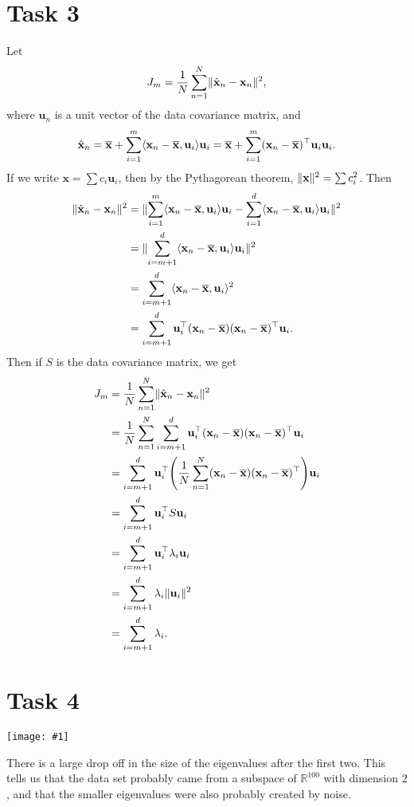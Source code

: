 \documentclass{article}
\newcommand{\T}{\top}
\newcommand{\R}{\mathbb{R}}
\newcommand{\mean}[1]{\overline{#1}}
\newcommand{\image}[2]{\begin{center}\texttt{[image: \#1]}\end{center}}
\renewcommand{\vec}[1]{\mathbf{#1}}
\DeclarePairedDelimiter{\p}{(}{)}
\DeclarePairedDelimiter{\norm}{\Vert}{\Vert}
\DeclarePairedDelimiter{\inner}{\langle}{\rangle}
\begin{document}
\section*{Task 3}
Let
\[
	J_m = \frac{1}{N} \sum_{n=1}^N \norm{\hat{\vec{x}}_n - \vec{x}_n}^2,
\]
where $\vec{u}_n$ is a unit vector of the data covariance matrix, and
\[
	\hat{\vec{x}}_n = \mean{\vec{x}} + \sum_{i=1}^m \inner{\vec{x}_n - \mean{\vec{x}}, \vec{u}_i}\vec{u}_i = \mean{\vec{x}} + \sum_{i=1}^m \p{\vec{x}_n - \mean{\vec{x}}}^\T\vec{u}_i\vec{u}_i.
\]
If we write $\vec{x} = \sum c_i\vec{u}_i$, then by the Pythagorean theorem, $\norm{\vec{x}}^2 = \sum c_i^2$. Then
\begin{align*}
	\norm{\hat{\vec{x}}_n - \vec{x}_n}^2 &= \norm{\sum_{i=1}^m \inner{\vec{x}_n - \mean{\vec{x}}, \vec{u}_i}\vec{u}_i - \sum_{i=1}^d \inner{\vec{x}_n - \mean{\vec{x}}, \vec{u}_i}\vec{u}_i}^2 \\
		&= \norm{\sum_{i=m+1}^d \inner{\vec{x}_n - \mean{\vec{x}}, \vec{u}_i}\vec{u}_i}^2 \\
		&= \sum_{i=m+1}^d \inner{\vec{x}_n - \mean{\vec{x}}, \vec{u}_i}^2 \\
		&= \sum_{i=m+1}^d \vec{u}_i^\T\p{\vec{x}_n - \mean{\vec{x}}}\p{\vec{x}_n - \mean{\vec{x}}}^\T\vec{u}_i.
\end{align*}
Then if $S$ is the data covariance matrix, we get
\begin{align*}
	J_m &= \frac{1}{N} \sum_{n=1}^N \norm{\hat{\vec{x}}_n - \vec{x}_n}^2 \\
	&= \frac{1}{N} \sum_{n=1}^N \sum_{i=m+1}^d \vec{u}_i^\T\p{\vec{x}_n - \mean{\vec{x}}}\p{\vec{x}_n - \mean{\vec{x}}}^\T\vec{u}_i \\
	&= \sum_{i=m+1}^d \vec{u}_i^\T \p*{\frac{1}{N} \sum_{n=1}^N \p{\vec{x}_n - \mean{\vec{x}}}\p{\vec{x}_n - \mean{\vec{x}}}^\T}\vec{u}_i \\
	&= \sum_{i=m+1}^d \vec{u}_i^\T S\vec{u}_i \\
	&= \sum_{i=m+1}^d \vec{u}_i^\T \lambda_i \vec{u}_i \\
	&= \sum_{i=m+1}^d \lambda_i \norm{\vec{u}_i}^2 \\
	&= \sum_{i=m+1}^d \lambda_i.
\end{align*}

\section*{Task 4}
\image{images/eigenvalues.png}{0.65}
There is a large drop off in the size of the eigenvalues after the first two. This tells us that the data set probably came from a subspace of $\R^{100}$ with dimension $2$, and that the smaller eigenvalues were also probably created by noise.
\end{document}

